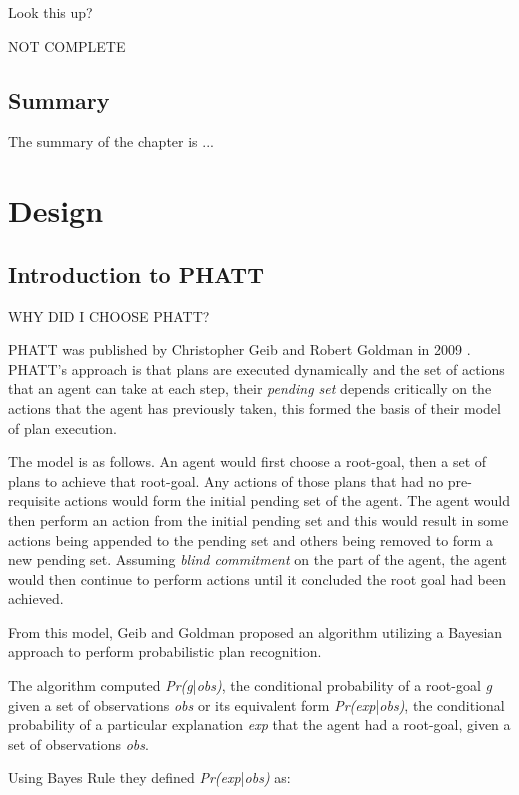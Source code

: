 \documentclass[parskip]{cs4rep}
\begin{document}
Look this up?

NOT COMPLETE

\section{Summary}

The summary of the chapter is ...

\chapter{Design}

\section{Introduction to PHATT}

WHY DID I CHOOSE PHATT?

PHATT was published by Christopher Geib and Robert Goldman in 2009 \cite{Geib:2009:PPR:1550966.1551246}. PHATT's approach is that plans are executed dynamically and the set of actions that an agent can take at each step, their \textit{pending set} depends critically on the actions that the agent has previously taken, this formed the basis of their model of plan execution.

The model is as follows. An agent would first choose a root-goal, then a set of plans to achieve that root-goal. Any actions of those plans that had no pre-requisite actions would form the initial pending set of the agent. The agent would then perform an action from the initial pending set and this would result in some actions being appended to the pending set and others being removed to form a new pending set. Assuming \textit{blind commitment} on the part of the agent, the agent would then continue to perform actions until it concluded the root goal had been achieved.

From this model, Geib and Goldman proposed an algorithm utilizing a Bayesian approach to perform probabilistic plan recognition. 

The algorithm computed \textit{Pr(g}|\textit{obs)}, the conditional probability of a root-goal \textit{g} given a set of observations \textit{obs} or its equivalent form \textit{Pr(exp}|\textit{obs)}, the conditional probability of a particular explanation \textit{exp} that the agent had a root-goal, given a set of observations \textit{obs}.

Using Bayes Rule they defined \textit{Pr(exp}|\textit{obs)} as:\newline
\end{document}
